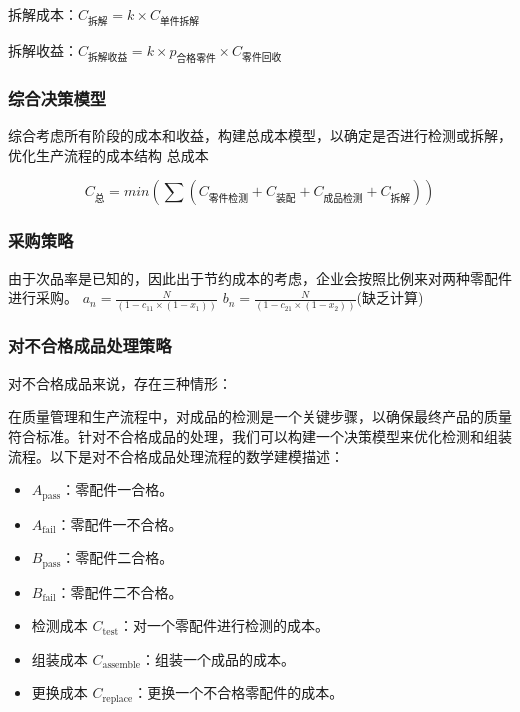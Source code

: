 \documentclass[withoutpreface,bwprint]{cumcmthesis}
\begin{document}
拆解成本：$C_{\text{拆解}} = k \times C_{\text{单件拆解}}$ 

拆解收益：$C_{\text{拆解收益}} = k \times p_{\text{合格零件}} \times C_{\text{零件回收}}$

\subsubsection{综合决策模型}

综合考虑所有阶段的成本和收益，构建总成本模型，以确定是否进行检测或拆解，优化生产流程的成本结构
总成本

$$C_{\text{总}} = min(\sum (C_{\text{零件检测}} + C_{\text{装配}} + C_{\text{成品检测}} + C_{\text{拆解}}))$$

\subsubsection{采购策略}
由于次品率是已知的，因此出于节约成本的考虑，企业会按照比例来对两种零配件进行采购。
$a_n = \frac{N}{(1-c_{11} \times (1 - x_1))}$
$b_n = \frac{N}{(1-c_{21} \times (1 - x_2))}$(缺乏计算)

\subsubsection{对不合格成品处理策略}
对不合格成品来说，存在三种情形：

在质量管理和生产流程中，对成品的检测是一个关键步骤，以确保最终产品的质量符合标准。针对不合格成品的处理，我们可以构建一个决策模型来优化检测和组装流程。以下是对不合格成品处理流程的数学建模描述：

\begin{itemize}
    \item $A_{\text{pass}} $：零配件一合格。
    \item $A_{\text{fail}} $：零配件一不合格。
    \item $B_{\text{pass}} $：零配件二合格。
    \item $B_{\text{fail}} $：零配件二不合格。
\end{itemize}

\begin{itemize}
    \item  检测成本 $ C_{\text{test}} $：对一个零配件进行检测的成本。
    \item 组装成本 $ C_{\text{assemble}} $：组装一个成品的成本。
    \item 更换成本 $C_{\text{replace}} $：更换一个不合格零配件的成本。 
\end{itemize}
\end{document}
